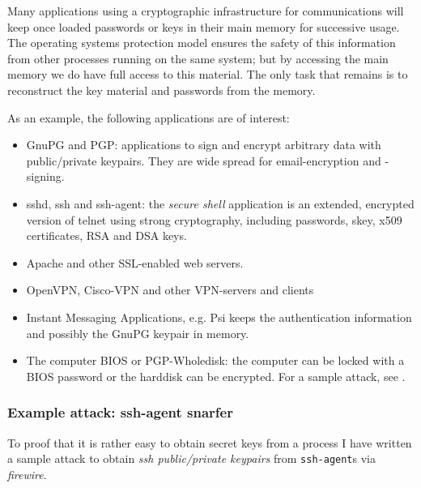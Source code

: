 Many applications using a cryptographic infrastructure for communications will
keep once loaded passwords or keys in their main memory for successive usage.
The operating systems protection model ensures the safety of this information
from other processes running on the same system; but by accessing the main
memory we do have full access to this material. The only task that remains is to
reconstruct the key material and passwords from the memory.

As an example, the following applications are of interest:

\begin{itemize}

	\item GnuPG and PGP: applications to sign and encrypt arbitrary data
	with public/private keypairs. They are wide spread for email-encryption
	and -signing.

	\item sshd, ssh and ssh-agent: the \emph{secure shell} application is an
	extended, encrypted version of telnet using strong cryptography,
	including passwords, skey, x509 certificates, RSA and DSA keys.

	\item Apache and other SSL-enabled web servers.

	\item OpenVPN, Cisco-VPN and other VPN-servers and clients

	\item Instant Messaging Applications, e.g. Psi keeps the authentication
	information and possibly the GnuPG keypair in memory.

	\item The computer BIOS or PGP-Wholedisk: the computer can be locked
	with a BIOS password or the harddisk can be encrypted. For a sample
	attack, see \cite{rux2k6firewire:2006}.

\end{itemize}


\subsubsection{Example attack: ssh-agent snarfer}

\label{ssh-agent-snarfer} To proof that it is rather easy to obtain secret keys
from a process I have written a sample attack to obtain \emph{ssh public/private
keypairs} from \texttt{ssh-agent}s via \emph{firewire}.

